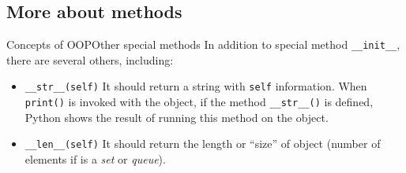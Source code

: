 \documentclass[10pt,compress]{beamer} %
\begin{document}
%		

\subsection{More about methods}

\begin{frame}{Concepts of OOP}{Other special methods}
In addition to special method \texttt{\_\_init\_\_}, there are several others, including:\\
	\begin{block}{}
		\vspace{-0.15cm}
		\begin{itemize}
		\item \footnotesize{\texttt{\_\_str\_\_(self)} It should return a string with \texttt{self} information.  When \texttt{print()} is invoked with the object, if the method \texttt{\_\_str\_\_()} is defined, Python shows the result of running this method on the object.}
		\item \footnotesize{\texttt{\_\_len\_\_(self)} It should return the length or ``size'' of object (number of elements if is a \textit{set} or \textit{queue}).}
		\end{itemize}
		\vspace{-0.2cm}
	\end{block}	
\end{frame}
\end{document}
